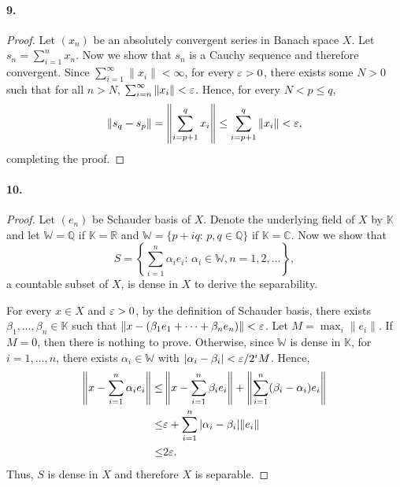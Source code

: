  \paragraph{9.}
  \begin{proof}
    Let $(x_n)$ be an absolutely convergent series in Banach space $X$. Let 
    $s_n=\sum_{i=1}^n x_n$. Now we show that $s_n$ is a Cauchy sequence and 
    therefore convergent. Since $\sum_{i=1}^\infty\|x_i\|<\infty$, for every 
    $\varepsilon>0$, there exists some $N>0$ such that for all $n>N$, $\sum_{i=n}
    ^\infty\|x_i\|<\varepsilon$. Hence, for every $N<p\le q$,
    \[
      \|s_q-s_p\| = \left\|\sum_{i=p+1}^q x_i\right\|
      \le \sum_{i=p+1}^q\|x_i\| < \varepsilon,
    \]
    completing the proof.
  \end{proof}

  \paragraph{10.}
  \begin{proof}
    Let $(e_n)$ be Schauder basis of $X$. Denote the underlying field of $X$ by
    $\mathbb{K}$ and let $\mathbb{W}=\mathbb{Q}$ if $\mathbb{K}=\mathbb{R}$ and
    $\mathbb{W}=\{p+iq:\, p,q\in\mathbb{Q}\}$ if $\mathbb{K}=\mathbb{C}$. Now we
    show that
    \[
      S = \left\{\sum_{i=1}^n\alpha_ie_i:\, 
      \alpha_i\in\mathbb{W}, n=1,2,\dots\right\},
    \]
    a countable subset of $X$, is dense in $X$ to derive the separability. \par
    For every $x\in X$ and $\varepsilon>0$, by the definition of Schauder basis, there 
    exists $\beta_1,\dots,\beta_n\in\mathbb{K}$ such that $\|x-(\beta_1e_1+
    \cdots+\beta_ne_n)\|<\varepsilon$. Let $M=\max_{i}\|e_i\|$. If $M=0$, then there is
    nothing to prove. Otherwise, since $\mathbb{W}$ is dense in $\mathbb{K}$,
    for $i=1,\dots,n$, there exists $\alpha_i\in\mathbb{W}$ with $|\alpha_i-
    \beta_i|<\varepsilon/2^iM$. Hence,
    \begin{align*}
      \left\|x-\sum_{i=1}^n\alpha_ie_i\right\|
      \le& \left\|x-\sum_{i=1}^n\beta_ie_i\right\| +
           \left\|\sum_{i=1}^n(\beta_i-\alpha_i)e_i\right\| \\
      \le& \varepsilon + \sum_{i=1}^n|\alpha_i-\beta_i|\|e_i\|  \\
      \le& 2\varepsilon.
    \end{align*}
    Thus, $S$ is dense in $X$ and therefore $X$ is separable.
  \end{proof}

